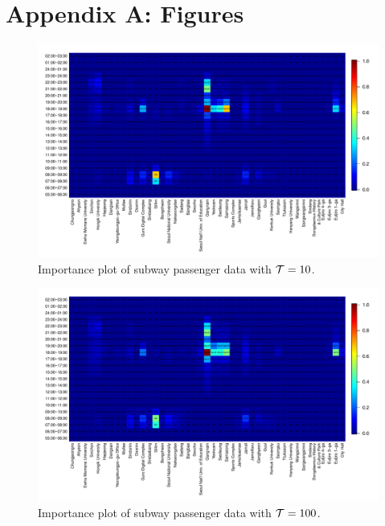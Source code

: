 \documentclass[preprint, review, 12pt]{article}
\theoremstyle{definition}
\theoremstyle{remark}
\begin{document}
\newpage
\section*{Appendix A: Figures}
\begin{figure}
	\centering
	\includegraphics[width=1.05\textwidth]{Fig/In_scale_1.pdf}
	\vspace{-13mm}
	\caption{Importance plot of subway passenger data with ${\cal T}=10$.}
	\label{snow:subway_in_01}
\end{figure}

\begin{figure}
	\centering
	\includegraphics[width=1.05\textwidth]{Fig/In_scale_2.pdf}
	\vspace{-13mm}
	\caption{Importance plot of subway passenger data with ${\cal T}=100$.}
	\label{snow:subway_in_1}
\end{figure}
\end{document}
